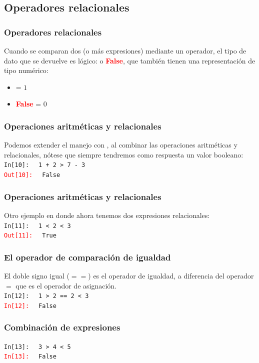 {\subsection{Operadores relacionales}
\begin{frame}
\frametitle{Operadores relacionales}
Cuando se comparan dos (o más expresiones) mediante un operador, el tipo de dato que se devuelve es lógico:  o \textcolor{red}{\textbf{False}}, que también tienen una representación de tipo numérico:
\begin{itemize}
\item {} = $1$
\item \textcolor{red}{\textbf{False}} = $0$
\end{itemize}
\end{frame}
\begin{frame}[fragile]
\frametitle{Operaciones aritméticas y relacionales}
Podemos extender el manejo con \python, al combinar las operaciones aritméticas y relacionales, nótese que siempre tendremos como respuesta un valor booleano:
\\
\bigskip
\textcolor{ao}{\texttt{In[10]: }} \verb| 1 + 2 > 7 - 3| \\
\pause
\textcolor{red}{\texttt{Out[10]: }} \verb| False|
\end{frame}
\begin{frame}[fragile]
\frametitle{Operaciones aritméticas y relacionales}
Otro ejemplo en donde ahora tenemos dos expresiones relacionales:
\\
\bigskip
\textcolor{ao}{\texttt{In[11]: }} \verb| 1 < 2 < 3| \\
\pause
\textcolor{red}{\texttt{Out[11]: }} \verb| True|
\end{frame}
\begin{frame}[fragile]
\frametitle{El operador de comparación de igualdad}
El doble signo igual ($==$) es el operador de igualdad, a diferencia del operador $=$ que es el operador de asignación.
\\
\bigskip
\textcolor{ao}{\texttt{In[12]: }} \verb| 1 > 2 == 2 < 3| \\
\pause
\textcolor{red}{\texttt{In[12]: }} \verb| False|
\end{frame}
\begin{frame}[fragile]
\frametitle{Combinación de expresiones}
\textcolor{ao}{\texttt{In[13]: }} \verb| 3 > 4 < 5| \\
\pause
\textcolor{red}{\texttt{In[13]: }} \verb| False|
\\
\bigskip

\end{frame}}
